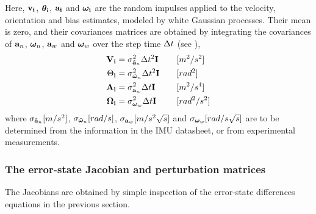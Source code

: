 Here, ${\bf v}_{\bf i}$, ${\bm \theta}_{\bf i}$, ${\bf a}_{\bf i}$ and ${\bm \omega}_{\bf i}$ are the random impulses applied to the velocity, orientation and bias estimates, modeled by white Gaussian processes. 
Their mean is zero, and their covariances matrices are obtained by integrating the covariances of ${\bf a}_n$, ${\bm \omega}_n$, ${\bf a}_w$ and ${\bm \omega}_w$ over the step time $\Delta t$ (see ),
%
%
\begin{align}
{\bf V}_{\bf i} &= \sigma_{\tilde{{\bf a}}_n}^2\Delta t^2{\bf I} \quad &&[m^2/s^2]\\
\Theta_{\bf i} &= \sigma_{\tilde{{\bm \omega}}_n}^2\Delta t^2{\bf I} \quad &&[rad^2] \\
{\bf A}_{\bf i} &= \sigma_{{\bf a}_w}^2\Delta t{\bf I} \quad &&[m^2/s^4] \\
{\bm \Omega}_{\bf i} &= \sigma_{{\bm \omega}_w}^2\Delta t{\bf I} \quad &&[rad^2/s^2] 
\end{align}%
%
where $\sigma_{\tilde{{\bf a}}_n}[m/s^2]$, $\sigma_{\tilde{{\bm \omega}}_n}[rad/s]$, $\sigma_{{\bf a}_w}[m/s^2\sqrt{s}]$ and $\sigma_{{\bm \omega}_w}[rad/s\sqrt{s}]$ are to be determined from the information in the IMU datasheet, or from experimental measurements.



\subsubsection{The error-state Jacobian and perturbation matrices}


The Jacobians are obtained by simple inspection of the error-state differences equations in the previous section. 

